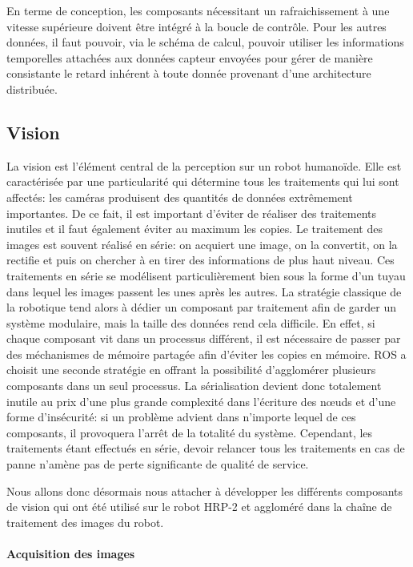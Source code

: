 En terme de conception, les composants nécessitant un rafraichissement
à une vitesse supérieure doivent être intégré à la boucle de
contrôle. Pour les autres données, il faut pouvoir, via le schéma de
calcul, pouvoir utiliser les informations temporelles attachées aux
données capteur envoyées pour gérer de manière consistante le retard
inhérent à toute donnée provenant d'une architecture distribuée.


\subsection{Vision}


La vision est l'élément central de la perception sur un robot
humanoïde. Elle est caractérisée par une particularité qui détermine
tous les traitements qui lui sont affectés: les caméras produisent des
quantités de données extrêmement importantes. De ce fait, il est
important d'éviter de réaliser des traitements inutiles et il faut
également éviter au maximum les copies. Le traitement des images est
souvent réalisé en série: on acquiert une image, on la convertit, on
la rectifie et puis on chercher à en tirer des informations de plus
haut niveau. Ces traitements en série se modélisent particulièrement
bien sous la forme d'un tuyau dans lequel les images passent les unes
après les autres. La stratégie classique de la robotique tend alors à
dédier un composant par traitement afin de garder un système
modulaire, mais la taille des données rend cela difficile. En effet,
si chaque composant vit dans un processus différent, il est nécessaire
de passer par des méchanismes de mémoire partagée afin d'éviter les
copies en mémoire. ROS a choisit une seconde stratégie en offrant la
possibilité d'agglomérer plusieurs composants dans un seul
processus. La sérialisation devient donc totalement inutile au prix
d'une plus grande complexité dans l'écriture des n\oe uds et d'une
forme d'insécurité: si un problème advient dans n'importe lequel de
ces composants, il provoquera l'arrêt de la totalité du
système. Cependant, les traitements étant effectués en série, devoir
relancer tous les traitements en cas de panne n'amène pas de perte
significante de qualité de service.


Nous allons donc désormais nous attacher à développer les différents
composants de vision qui ont été utilisé sur le robot HRP-2 et
aggloméré dans la chaîne de traitement des images du robot.


\paragraph{Acquisition des images}


